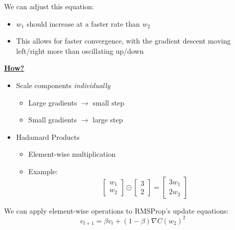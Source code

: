 We can adjust this equation:
\begin{itemize}
    \item $w_1$ should increase at a faster rate than $w_2$
    \item This allows for faster convergence, with the gradient descent moving left/right more than oscillating up/down
\end{itemize}
\underline{\textbf{How?}}
\begin{itemize}
    \item Scale components \textit{individually}
    \begin{itemize}
        \item Large gradients $\rightarrow$ small step
        \item Small gradients $\rightarrow$ large step
    \end{itemize}
    \item Hadamard Products
    \begin{itemize}
        \item Element-wise multiplication
        \item Example: \\
        \[
        \begin{bmatrix}
            w_1 \\
            w_2
        \end{bmatrix} \odot 
        \begin{bmatrix}
            3 \\
            2
        \end{bmatrix} =
        \begin{bmatrix}
            3w_1 \\
            2w_2
        \end{bmatrix}
        \]
    \end{itemize}
    
\end{itemize}
We can apply element-wise operations to RMSProp's update equations:
\[
v_{t+1} = \beta v_t + (1-\beta) \nabla C(w_2)^2
\]

